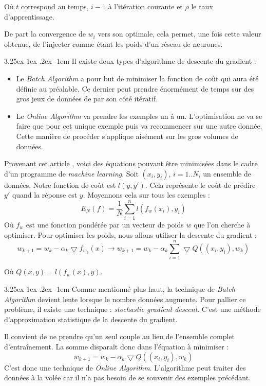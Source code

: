 \documentclass[a4paper, 11pt]{article}
\makeatletter
\renewcommand\paragraph{\@startsection{paragraph}{5}{\z@}%
  {3.25ex \@plus1ex \@minus.2ex}%
  {-1em}%
  {\normalfont\normalsize\bfseries}}
\makeatother
\begin{document}
Où $t$ correspond au temps, $i-1$ à l'itération courante et $\rho$ le taux d'apprentissage.

De part la convergence de $w_i$ vers son optimale, cela permet, une fois cette valeur obtenue, de l'injecter comme étant les poids d'un réseau de neurones.

\paragraph{}
Il existe deux types d'algorithme de descente du gradient :
\begin{itemize}
\item Le \textit{Batch Algorithm} a pour but de minimiser la fonction de coût qui aura été définie au préalable. Ce dernier peut prendre énormément de temps sur des gros jeux de données de par son côté itératif.
\item Le \textit{Online Algorithm} va prendre les exemples un à un. L'optimisation ne va se faire que pour cet unique exemple puis va recommencer sur une autre donnée. Cette manière de procéder s'applique aisément sur les gros volumes de données.
\end{itemize}

Provenant cet article \cite{descente_du_gradient_stochastique}, voici des équations pouvant être minimisées dans le cadre d'un programme de \textit{machine learning}.
Soit $(x_i,y_i)\text{,\ } i=1..N$, un ensemble de données. Notre fonction de coût est $l(y,y')$. Cela représente le coût de prédire $y'$ quand la réponse est $y$. Moyennons cela sur tous les exemples :
$$E_N(f) = \frac{1}{N} \sum_{i=1}^{n}l(f_w(x_i),y_i)$$
Où $f_w$ est une fonction pondérée par un vecteur de poids $w$ que l'on cherche à optimiser.
Pour optimiser les poids, nous allons utiliser la descente du gradient :
$$w_{k+1} = w_k - \alpha_k \bigtriangledown f_{w_k}(x) \rightarrow w_{k+1} = w_k -\alpha_k \sum_{i=1}^n \bigtriangledown Q ((x_i,y_i), w_k)$$

Où $Q(x,y) = l(f_w(x),y)$.

\paragraph{}
Comme mentionné plus haut, la technique de \textit{Batch Algorithm} devient lente lorsque le nombre données augmente. Pour pallier ce problème, il existe une technique : \textit{stochastic gradient descent}. C'est une méthode d'approximation statistique de la descente du gradient.

Il convient de ne prendre qu'un seul couple au lieu de l'ensemble complet d'entraînement. La somme disparaît donc dans l'équation à minimiser :
$$w_{k+1} = w_k -\alpha_k \bigtriangledown Q ((x_i,y_i), w_k)$$
C'est donc une technique de \textit{Online Algorithm}. L'algorithme peut traiter des données à la volée car il n'a pas besoin de se souvenir des exemples précédant.
\end{document}
